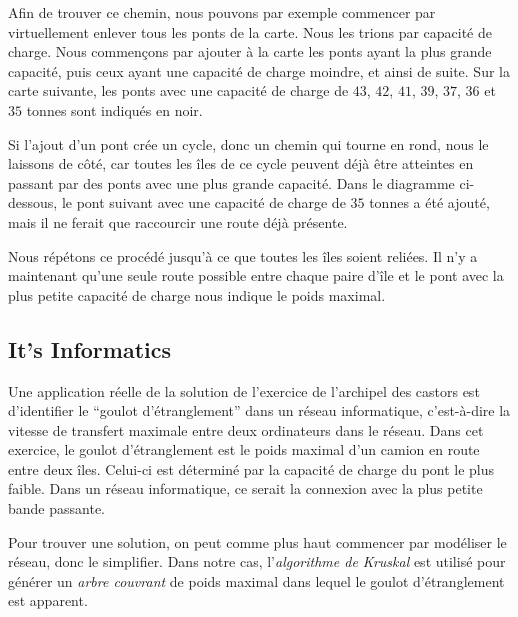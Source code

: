 \documentclass[a4paper,11pt]{report}
\newcommand{\taskGraphicsFolder}{..}
\begin{document}
Afin de trouver ce chemin, nous pouvons par exemple commencer par virtuellement enlever tous les ponts de la carte. Nous les trions par capacité de charge. Nous commençons par ajouter à la carte les ponts ayant la plus grande capacité, puis ceux ayant une capacité de charge moindre, et ainsi de suite. Sur la carte suivante, les ponts avec une capacité de charge de $43$, $42$, $41$, $39$, $37$, $36$ et $35$ tonnes sont indiqués en noir.

{\centering%
\par}

Si l’ajout d’un pont crée un cycle, donc un chemin qui tourne en rond, nous le laissons de côté, car toutes les îles de ce cycle peuvent déjà être atteintes en passant par des ponts avec une plus grande capacité. Dans le diagramme ci-dessous, le pont suivant avec une capacité de charge de $35$ tonnes a été ajouté, mais il ne ferait que raccourcir une route déjà présente.

{\centering%
\par}

Nous répétons ce procédé jusqu’à ce que toutes les îles soient reliées. Il n’y a maintenant qu’une seule route possible entre chaque paire d’île et le pont avec la plus petite capacité de charge nous indique le poids maximal.

{\centering%
\par}


\subsection*{It’s Informatics}

Une application réelle de la solution de l’exercice de l’archipel des castors est d’identifier le “goulot d’étranglement” dans un réseau informatique, c’est-à-dire la vitesse de transfert maximale entre deux ordinateurs dans le réseau. Dans cet exercice, le goulot d’étranglement est le poids maximal d’un camion en route entre deux îles. Celui-ci est déterminé par la capacité de charge du pont le plus faible. Dans un réseau informatique, ce serait la connexion avec la plus petite bande passante.

Pour trouver une solution, on peut comme plus haut commencer par modéliser le réseau, donc le simplifier. Dans notre cas, l’\emph{algorithme de Kruskal} est utilisé pour générer un \emph{arbre couvrant} de poids maximal dans lequel le goulot d’étranglement est apparent.
\end{document}
